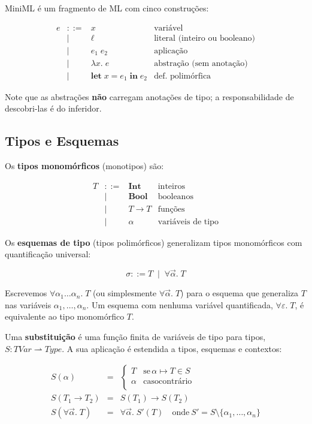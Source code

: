 MiniML é um fragmento de ML com cinco construções:

\[
  \begin{array}{rcll} e & ::= & x & \text{variável} \\ & | & \ell &
    \text{literal (inteiro ou booleano)} \\ & | & e_1\; e_2 & \text{aplicação}
    \\ & | & \lambda x.\; e & \text{abstração (sem anotação)} \\ & | &
    \mathbf{let}\; x = e_1\; \mathbf{in}\; e_2 & \text{def. polimórfica}
\end{array} \]

Note que as abstrações \textbf{não} carregam anotações de tipo; a
responsabilidade de descobri-las é do inferidor.

\subsection{Tipos e Esquemas}\label{tipos-e-esquemas}

Os \textbf{tipos monomórficos} (monotipos) são:

\[
  \begin{array}{rcll} T & ::= & \mathbf{Int} & \text{inteiros} \\ & | &
    \mathbf{Bool} & \text{booleanos} \\ & | & T \to T & \text{funções} \\ & | &
    \alpha & \text{variáveis de tipo}
\end{array} \]

Os \textbf{esquemas de tipo} (tipos polimórficos) generalizam
tipos monomórficos com quantificação universal:

\[ \sigma ::= T \;\mid\; \forall \vec{\alpha}.\; T \]

Escrevemos \(\forall \alpha_1 \ldots \alpha_n.\; T\) (ou simplesmente
\(\forall \vec{\alpha}.\; T\)) para o esquema que generaliza \(T\)
nas variáveis \(\alpha_1, \ldots, \alpha_n\). Um esquema com nenhuma
variável quantificada, \(\forall \varepsilon.\; T\), é equivalente ao
tipo monomórfico \(T\).

Uma \textbf{substituição} é uma função finita de variáveis de tipo
para tipos, \(S : \mathit{TVar} \rightharpoonup
\mathit{Type}\). A sua aplicação é estendida a tipos,
esquemas e contextos:

\[
  \begin{array}{lcl}
    S(\alpha) & = & \left\{
      \begin{array}{ll}
        T & \mathrm{se}\, \alpha\mapsto T \in S \\
        \alpha & \mathrm{caso contrário}\\
      \end{array}
      \right.\\
      S(T_1 \to T_2) & = & S(T_1) \to S(T_2)\\
      S(\forall \vec{\alpha}.\; T) & = & \forall \vec{\alpha}.\; S'(T) \quad
      \mathrm{onde }\: S' = S \setminus \{\alpha_1, \ldots, \alpha_n\}
    \end{array}
  \]

